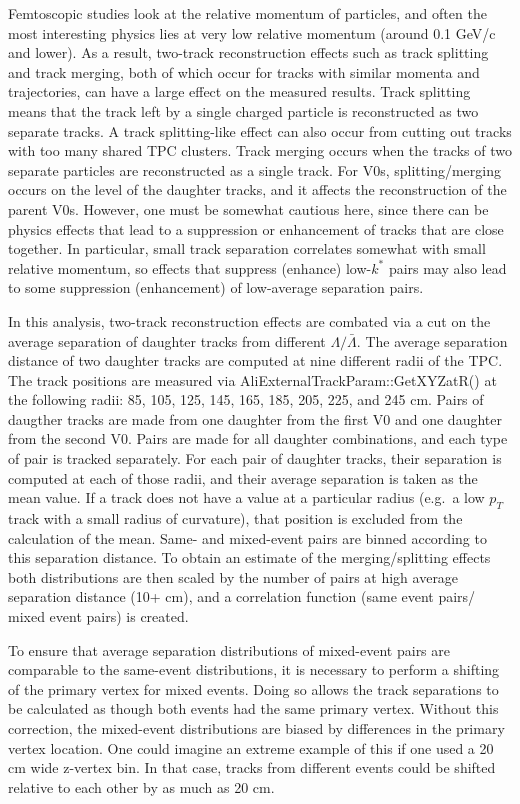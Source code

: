 Femtoscopic studies look at the relative momentum of particles, and often the most interesting physics lies at very low relative momentum (around 0.1 GeV/c and lower).  
As a result, two-track reconstruction effects such as track splitting and track merging, both of which occur for tracks with similar momenta and trajectories, can have a large effect on the measured results.  
Track splitting means that the track left by a single charged particle is reconstructed as two separate tracks. 
A track splitting-like effect can also occur from cutting out tracks with too many shared TPC clusters.
Track merging occurs when the tracks of two separate particles are reconstructed as a single track.  
For V0s, splitting/merging occurs on the level of the daughter tracks, and it affects the reconstruction of the parent V0s.
However, one must be somewhat cautious here, since there can be physics effects that lead to a suppression or enhancement of tracks that are close together.
In particular, small track separation correlates somewhat with small relative momentum, so effects that suppress (enhance) low-$k^*$ pairs may also lead to some suppression (enhancement) of low-average separation pairs.  

In this analysis, two-track reconstruction effects are combated via a cut on the average separation of daughter tracks from different $\Lambda/\bar{\Lambda}$.  
The average separation distance of two daughter tracks are computed at nine different radii of the TPC.  
The track positions are measured via AliExternalTrackParam::GetXYZatR() at the following radii: 85, 105, 125, 145, 165, 185, 205, 225, and 245 cm.  
Pairs of daugther tracks are made from one daughter from the first V0 and one daughter from the second V0. Pairs are made for all daughter combinations, and each type of pair is tracked separately.
For each pair of daughter tracks, their separation is computed at each of those radii, and their average separation is taken as the mean value. If a track does not have a value at a particular radius (e.g.\ a low $p_T$ track with a small radius of curvature), that position is excluded from the calculation of the mean.
Same- and mixed-event pairs are binned according to this separation distance.  
To obtain an estimate of the merging/splitting effects both distributions are then scaled by the number of pairs at high average separation distance (10+ cm), and a correlation function (same event pairs/ mixed event pairs) is created. 

To ensure that average separation distributions of mixed-event pairs are comparable to the same-event distributions, it is necessary to perform a shifting of the primary vertex for mixed events.  
Doing so allows the track separations to be calculated as though both events had the same primary vertex.  
Without this correction, the mixed-event distributions are biased by differences in the primary vertex location.  
One could imagine an extreme example of this if one used a 20 cm wide z-vertex bin.  
In that case, tracks from different events could be shifted relative to each other by as much as 20 cm. 

